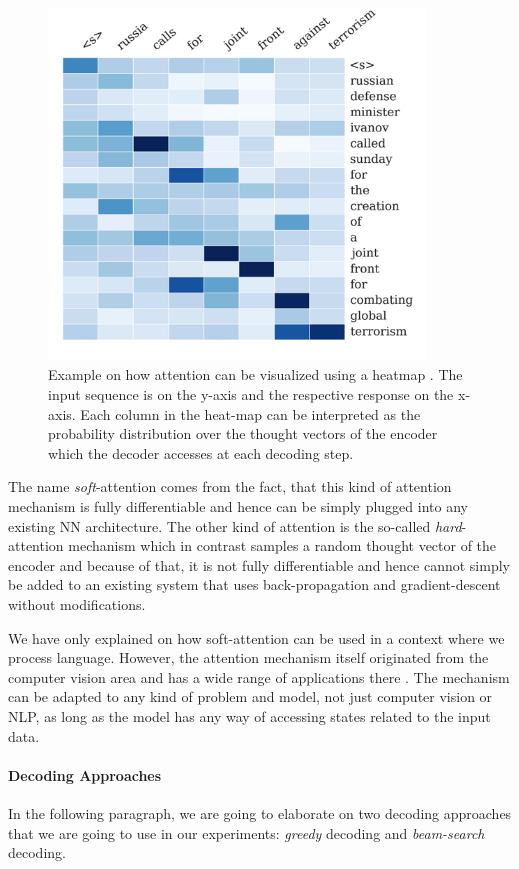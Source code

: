 \begin{figure}[H]
	\centering
	\includegraphics[width=10cm]{img/attention_heatmap_example}
	\caption{Example on how attention can be visualized using a heatmap \cite{Rush:2015}. The input sequence is on the y-axis and the respective response on the x-axis. Each column in the heat-map can be interpreted as the probability distribution over the thought vectors of the encoder which the decoder accesses at each decoding step.}
	\label{fundamentals:seq2seq:attention_weights_visualization}
\end{figure}

The name \emph{soft}-attention comes from the fact, that this kind of attention mechanism is fully differentiable and hence can be simply plugged into any existing NN architecture. The other kind of attention is the so-called \emph{hard}-attention mechanism which in contrast samples a random thought vector of the encoder and because of that, it is not fully differentiable and hence cannot simply be added to an existing system that uses back-propagation and gradient-descent without modifications.

We have only explained on how soft-attention can be used in a context where we process language. However, the attention mechanism itself originated from the computer vision area \cite{Desimone:1995}\cite{Itti:1998}\cite{Mnih:2014} and has a wide range of applications there \cite{Gregor:2015}\cite{Xu:2015}\cite{Cho:2015}. The mechanism can be adapted to any kind of problem and model, not just computer vision or NLP, as long as the model has any way of accessing states related to the input data.

\paragraph{Decoding Approaches}
\label{fundamentals:decoding_approaches}
In the following paragraph, we are going to elaborate on two decoding approaches that we are going to use in our experiments: \emph{greedy} decoding and \emph{beam-search} decoding.

